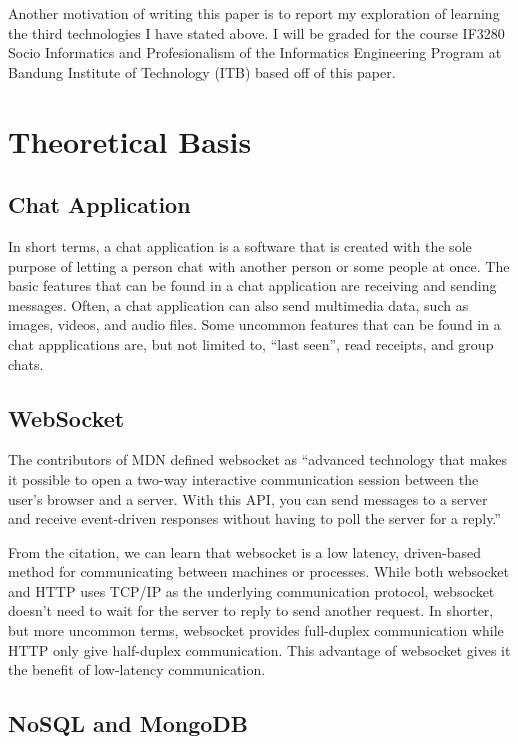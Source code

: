 \documentclass[conference]{IEEEtran}
\begin{document}
Another motivation of writing this paper is to report my exploration of learning the
third technologies I have stated above. I will be graded for the course IF3280 Socio
Informatics and Profesionalism of the Informatics Engineering Program at Bandung
Institute of Technology (ITB) based off of this paper.

\section{Theoretical Basis}

\subsection{Chat Application}

In short terms, a chat application is a software that is created with the sole
purpose of letting a person chat with another person or some people at once. The
basic features that can be found in a chat application are receiving and sending
messages. Often, a chat application can also send multimedia data, such as images,
videos, and audio files. Some uncommon features that can be found in a chat
appplications are, but not limited to, ``last seen'', read receipts, and group chats.

\subsection{WebSocket}

The contributors of MDN \cite{b1} defined websocket as ``advanced technology that
makes it possible to open a two-way interactive communication session between the
user's browser and a server. With this API, you can send messages to a server and
receive event-driven responses without having to poll the server for a reply.''

From the citation, we can learn that websocket is a low latency, driven-based method for
communicating between machines or processes. While both websocket and HTTP uses TCP/IP
as the underlying communication protocol, websocket doesn't need to wait for the server
to reply to send another request. In shorter, but more uncommon terms, websocket provides
full-duplex communication while HTTP only give half-duplex communication. This advantage
of websocket gives it the benefit of low-latency communication.

\subsection{NoSQL and MongoDB}
\end{document}
